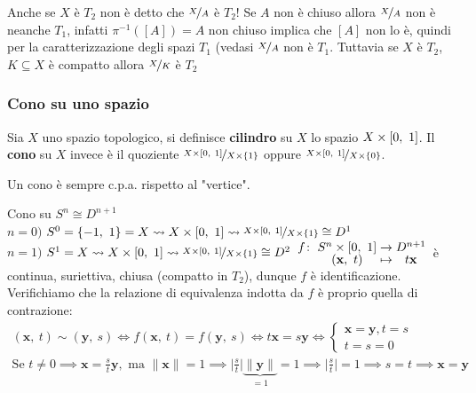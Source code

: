 \begin{attention}
	Anche se $X$ è $T_2$ non è detto che $\nicefrac{X}{A}$ è $T_2$!\newline
	Se $A$ non è chiuso allora $\nicefrac{X}{A}$ non è neanche $T_1$, infatti $\pi^{-1}([A])=A$ non chiuso implica che $[A]$ non lo è, quindi per la caratterizzazione degli spazi $T_1$ (vedasi %
	$\nicefrac{X}{A}$ non è $T_1$.\newline 
	Tuttavia se $X$ è $T_2$, $K\subseteq X$ è compatto allora $\nicefrac{X}{K}$ è $T_2$
\end{attention}

\subsubsection{Cono su uno spazio}
\begin{define}
	Sia $X$ uno spazio topologico, si definisce \textbf{cilindro} su $X$ lo spazio $X\times \left[0,\ 1\right]$.\newline 
	Il \textbf{cono} su $X$ invece è il quoziente $\displaystyle \nicefrac{X\times\left[0,\ 1\right]}{X\times\{1\}}$ oppure $\displaystyle \nicefrac{X\times\left[0,\ 1\right]}{X\times\{0\}}$.
\end{define}

\begin{observe}
	Un cono è sempre c.p.a. rispetto al "vertice".
\end{observe}


\begin{example} Cono su $S^n \cong D^{n+1}$\\
	$n=0)$ $S^0=\{-1, \ 1\}=X \rightsquigarrow X\times\left[0,\ 1\right] \rightsquigarrow \nicefrac{X\times\left[0,\ 1\right]}{X\times \{1\}} \cong D^1$ \\
	$n=1)$ $S^1=X \rightsquigarrow X\times\left[0,\ 1\right] \rightsquigarrow \nicefrac{X\times\left[0,\ 1\right]}{X\times \{1\}} \cong D^2$
	$\funztot f {S^n\times\intv} {D^{n+1}} {(\mathbf{x}, \ t)} {t\mathbf{x}}$ è continua, suriettiva, chiusa (compatto in $T_2$), dunque $f$ è identificazione.\\
	Verifichiamo che la relazione di equivalenza indotta da $f$ è proprio quella di contrazione:
		\begin{gather*}
			(\mathbf{x}, \ t)\sim (\mathbf{y}, \ s) \iff f(\mathbf{x}, \ t)=f(\mathbf{y}, \ s) \iff t\mathbf{x}=s\mathbf{y} \iff \begin{cases} 
				\mathbf{x=y}, t=s \\ 
				t=s=0 
			\end{cases}\\
			\text{Se } t\neq 0 \implies \mathbf{x}=\frac{s}{t}\mathbf{y}, \text{ ma } \|\mathbf{x}\|=1 \implies \lvert \frac{s}{t} \rvert \underbrace{\|\mathbf{y}\|}_{=1}=1 \implies \lvert \frac{s}{t} \rvert=1 \implies s=t \implies \mathbf{x=y}
		\end{gather*}
\end{example}

